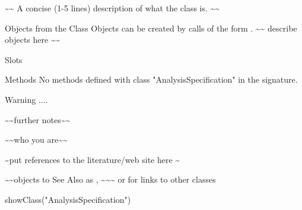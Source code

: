 \begin{Description}\relax
\textasciitilde{}\textasciitilde{} A concise (1-5 lines) description of what the class is.  \textasciitilde{}\textasciitilde{}
\end{Description}
\begin{Section}{Objects from the Class}
Objects can be created by calls of the form .
\textasciitilde{}\textasciitilde{} describe objects here \textasciitilde{}\textasciitilde{}
\end{Section}
\begin{Section}{Slots}
\end{Section}
\begin{Section}{Methods}
No methods defined with class "AnalysisSpecification" in the signature.
\end{Section}
\begin{Section}{Warning}
....
\end{Section}
\begin{Note}\relax
\textasciitilde{}\textasciitilde{}further notes\textasciitilde{}\textasciitilde{}
\end{Note}
\begin{Author}\relax
\textasciitilde{}\textasciitilde{}who you are\textasciitilde{}\textasciitilde{}
\end{Author}
\begin{References}\relax
\textasciitilde{}put references to the literature/web site here \textasciitilde{}
\end{References}
\begin{SeeAlso}\relax
\textasciitilde{}\textasciitilde{}objects to See Also as , \textasciitilde{}\textasciitilde{}\textasciitilde{}
or  for links to other classes
\end{SeeAlso}
\begin{Examples}
\begin{ExampleCode}
showClass("AnalysisSpecification")
\end{ExampleCode}
\end{Examples}

